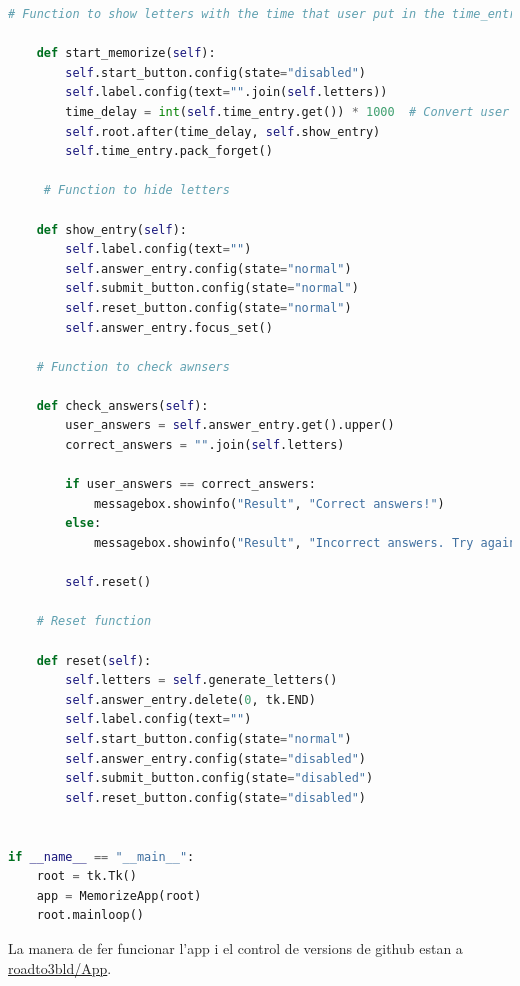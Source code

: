 \begin{lstlisting}[language=Python, style=colorEX, caption=Codi sencer de l'App]
     # Function to show letters with the time that user put in the time_entry textbox.

    def start_memorize(self):
        self.start_button.config(state="disabled")
        self.label.config(text="".join(self.letters))
        time_delay = int(self.time_entry.get()) * 1000  # Convert user seconds to milliseconds
        self.root.after(time_delay, self.show_entry)
        self.time_entry.pack_forget()  

     # Function to hide letters

    def show_entry(self):
        self.label.config(text="")
        self.answer_entry.config(state="normal")
        self.submit_button.config(state="normal")
        self.reset_button.config(state="normal")
        self.answer_entry.focus_set()

    # Function to check awnsers 

    def check_answers(self):
        user_answers = self.answer_entry.get().upper()
        correct_answers = "".join(self.letters)

        if user_answers == correct_answers:
            messagebox.showinfo("Result", "Correct answers!")
        else:
            messagebox.showinfo("Result", "Incorrect answers. Try again.")

        self.reset()

    # Reset function

    def reset(self):
        self.letters = self.generate_letters()
        self.answer_entry.delete(0, tk.END)
        self.label.config(text="")
        self.start_button.config(state="normal")
        self.answer_entry.config(state="disabled")
        self.submit_button.config(state="disabled")
        self.reset_button.config(state="disabled")
   

if __name__ == "__main__":
    root = tk.Tk()
    app = MemorizeApp(root)
    root.mainloop()

    \end{lstlisting}


La manera de fer funcionar l'app i el control de versions de github estan a \href{https://polsances13.github.io/roadto3bld/App.Html}{roadto3bld/App}.


